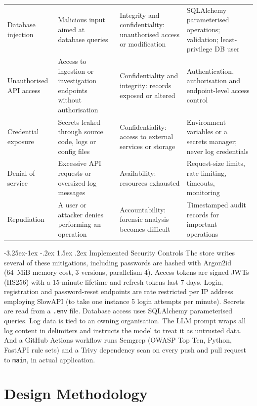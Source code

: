 \documentclass[12pt,a4paper]{report}
\makeatletter
\renewcommand\subsection{\@startsection{subsection}{2}{\z@}%
  {-3.25ex\@plus -1ex \@minus -.2ex}%
  {1.5ex \@plus .2ex}%
  {\normalfont\fontsize{12}{18}\selectfont\bfseries}}
\makeatother
\begin{document}
\begin{longtable}{>{\raggedright\arraybackslash}p{2.1cm} >{\raggedright\arraybackslash}p{4.2cm} >{\raggedright\arraybackslash}p{4.0cm} >{\raggedright\arraybackslash}p{5.4cm}}
Database injection & Malicious input aimed at database queries & Integrity and confidentiality: unauthorised access or modification & SQLAlchemy parameterised operations; validation; least-privilege DB user\\
Unauthorised API access & Access to ingestion or investigation endpoints without authorisation & Confidentiality and integrity: records exposed or altered & Authentication, authorisation and endpoint-level access control\\
Credential exposure & Secrets leaked through source code, logs or config files & Confidentiality: access to external services or storage & Environment variables or a secrets manager; never log credentials\\
Denial of service & Excessive API requests or oversized log messages & Availability: resources exhausted & Request-size limits, rate limiting, timeouts, monitoring\\
Repudiation & A user or attacker denies performing an operation & Accountability: forensic analysis becomes difficult & Timestamped audit records for important operations\\
\end{longtable}
\normalsize

\subsection{Implemented Security Controls}
The store writes several of these mitigations, including passwords are hashed with Argon2id (64~MiB memory cost, 3 versions, parallelism 4). Access tokens are signed JWTs (HS256) with a 15-minute lifetime and refresh tokens last 7 days. Login, registration and password-reset endpoints are rate restricted per IP address employing SlowAPI (to take one instance 5 login attempts per minute). Secrets are read from a \texttt{.env} file. Database access uses SQLAlchemy parameterised queries. Log data is tied to an owning organisation. The LLM prompt wraps all log content in delimiters and instructs the model to treat it as untrusted data. And a GitHub Actions workflow runs Semgrep (OWASP Top Ten, Python, FastAPI rule sets) and a Trivy dependency scan on every push and pull request to \texttt{main}, in actual application.

\chapter{Design Methodology}
\end{document}
